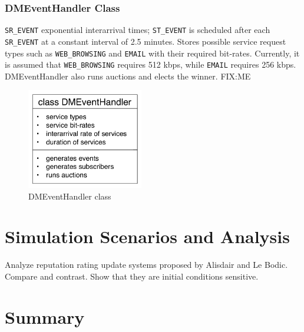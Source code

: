 \subsubsection{DMEventHandler Class} %
\label{ssub:dmeventhandler_class_dynamic}
\lstinline{SR_EVENT} exponential interarrival times; \lstinline{ST_EVENT} is scheduled after each \lstinline{SR_EVENT} at a constant interval of 2.5 minutes. Stores possible service request types such as \lstinline{WEB_BROWSING} and \lstinline{EMAIL} with their required bit-rates. Currently, it is assumed that \lstinline{WEB_BROWSING} requires 512 kbps, while \lstinline{EMAIL} requires 256 kbps. DMEventHandler also runs auctions and elects the winner. FIX:ME

\begin{figure}[t]
	\includegraphics[width=2in]{3/Figures/dmeventhandler_class}
	\caption{DMEventHandler class}
	\label{fig:dmeventhandler_class_dynamic}
\end{figure}


\section{Simulation Scenarios and Analysis} %
\label{sec:simulation_scenarios_and_analysis_dynamic}
Analyze reputation rating update systems proposed by Alisdair and Le Bodic. Compare and contrast. Show that they are initial conditions sensitive.

\section{Summary} %
\label{sec:summary_dynamic}


